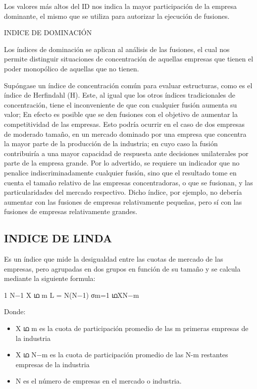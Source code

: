 \documentclass[
  letterpaper,
  DIV=11,
  numbers=noendperiod]{scrartcl}
\begin{document}
Los valores más altos del ID nos indica la mayor participación de la
empresa dominante, el mismo que se utiliza para autorizar la ejecución
de fusiones.

INDICE DE DOMINACIÓN

Los índices de dominación se aplican al análisis de las fusiones, el
cual nos permite distinguir situaciones de concentración de aquellas
empresas que tienen el poder monopólico de aquellas que no tienen.

Supóngase un índice de concentración común para evaluar estructuras,
como es el índice de Herfindahl (H). Este, al igual que los otros
índices tradicionales de concentración, tiene el inconveniente de que
con cualquier fusión aumenta su valor; En efecto es posible que se den
fusiones con el objetivo de aumentar la competitividad de las empresas.
Esto podría ocurrir en el caso de dos empresas de moderado tamaño, en un
mercado dominado por una empresa que concentra la mayor parte de la
producción de la industria; en cuyo caso la fusión contribuiría a una
mayor capacidad de respuesta ante decisiones unilaterales por parte de
la empresa grande. Por lo advertido, se requiere un indicador que no
penalice indiscriminadamente cualquier fusión, sino que el resultado
tome en cuenta el tamaño relativo de las empresas concentradoras, o que
se fusionan, y las particularidades del mercado respectivo. Dicho
índice, por ejemplo, no debería aumentar con las fusiones de empresas
relativamente pequeñas, pero sí con las fusiones de empresas
relativamente grandes.

\hypertarget{indice-de-linda}{%
\subsection{INDICE DE LINDA}\label{indice-de-linda}}

Es un índice que mide la desigualdad entre las cuotas de mercado de las
empresas, pero agrupadas en dos grupos en función de su tamaño y se
calcula mediante la siguiente formula:

1 N−1 X ഥ m L = N(N−1) σm=1 ഥXN−m

Donde:

\begin{itemize}
\item
  X ഥ m es la cuota de participación promedio de las m primeras empresas
  de la industria
\item
  X ഥ N−m es la cuota de participación promedio de las N-m restantes
  empresas de la industria
\item
  N es el número de empresas en el mercado o industria.
\end{itemize}
\end{document}
